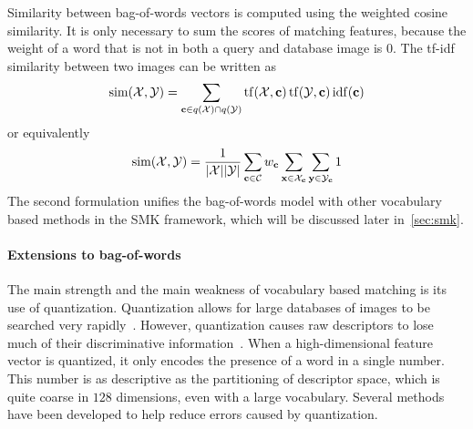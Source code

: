             Similarity between bag-of-words vectors is computed using the weighted cosine similarity. It is only
            necessary to sum the scores of matching features, because the weight of a word that is not in both a
            query and database image is $0$.
            The tf-idf similarity between two images can be written as
            \begin{equation}
                \operatorname{sim}(\mathcal{X}, \mathcal{Y}) = \sum_{\mathbf{c} \in q(\mathcal{X}) \cap q(\mathcal{Y})} \operatorname{tf}(\mathcal{X}, \mathbf{c}) \operatorname{tf}(\mathcal{Y}, \mathbf{c}) \operatorname{idf}(\mathbf{c}) 
            \end{equation}
            or equivalently
            \begin{equation}
                \operatorname{sim}(\mathcal{X}, \mathcal{Y}) = \frac{1}{|\mathcal{X}||\mathcal{Y}|}\sum_{\mathbf{c} \in \mathcal{C}} w_{\mathbf{c}} \sum_{\mathbf{x} \in \mathcal{X}_{\mathbf{c}}} \sum_{\mathbf{y} \in \mathcal{Y}_{\mathbf{c}}} 1
            \end{equation}
            The second formulation unifies the bag-of-words model with other vocabulary based methods in the SMK
            framework, which will be discussed later in~\cref{sec:smk}.

        \paragraph{Extensions to bag-of-words}
            The main strength and the main weakness of vocabulary based matching is its use of quantization.
            Quantization allows for large databases of images to be searched very
            rapidly~\cite{nister_scalable_2006}. However, quantization causes raw descriptors to lose much of their
            discriminative information~\cite{philbin_lost_2008, boiman_defense_2008}. When a high-dimensional
            feature vector is quantized, it only encodes the presence of a word in a single number. This number is
            as descriptive as the partitioning of descriptor space, which is quite coarse in $128$ dimensions, even
            with a large vocabulary. Several methods have been developed to help reduce errors caused by
            quantization.

